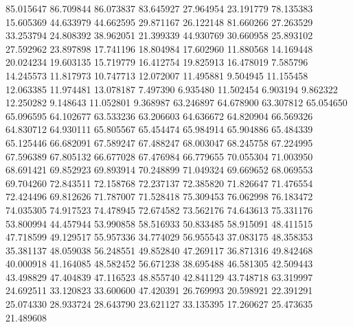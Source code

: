 85.015647
86.709844
86.073837
83.645927
27.964954
23.191779
78.135383
15.605369
44.633979
44.662595
29.871167
26.122148
81.660266
27.263529
33.253794
24.808392
38.962051
21.399339
44.930769
30.660958
25.893102
27.592962
23.897898
17.741196
18.804984
17.602960
11.880568
14.169448
20.024234
19.603135
15.719779
16.412754
19.825913
16.478019
7.585796
14.245573
11.817973
10.747713
12.072007
11.495881
9.504945
11.155458
12.063385
11.974481
13.078187
7.497390
6.935480
11.502454
6.903194
9.862322
12.250282
9.148643
11.052801
9.368987
63.246897
64.678900
63.307812
65.054650
65.096595
64.102677
63.533236
63.206603
64.636672
64.820904
66.569326
64.830712
64.930111
65.805567
65.454474
65.984914
65.904886
65.484339
65.125446
66.682091
67.589247
67.488247
68.003047
68.245758
67.224995
67.596389
67.805132
66.677028
67.476984
66.779655
70.055304
71.003950
68.691421
69.852923
69.893914
70.248899
71.049324
69.669652
68.069553
69.704260
72.843511
72.158768
72.237137
72.385820
71.826647
71.476554
72.424496
69.812626
71.787007
71.528418
75.309453
76.062998
76.183472
74.035305
74.917523
74.478945
72.674582
73.562176
74.643613
75.331176
53.800994
44.457944
53.990858
58.516933
50.833485
58.915091
48.411515
47.718599
49.129517
55.957336
34.774029
56.955543
37.083175
48.358353
35.381137
48.059038
56.248551
49.852840
47.269117
36.871316
49.842468
40.000918
41.164085
48.582452
56.671238
38.695488
46.581305
42.509443
43.498829
47.404839
47.116523
48.855740
42.841129
43.748718
63.319997
24.692511
33.120823
33.600600
47.420391
26.769993
20.598921
22.391291
25.074330
28.933724
28.643790
23.621127
33.135395
17.260627
25.473635
21.489608
